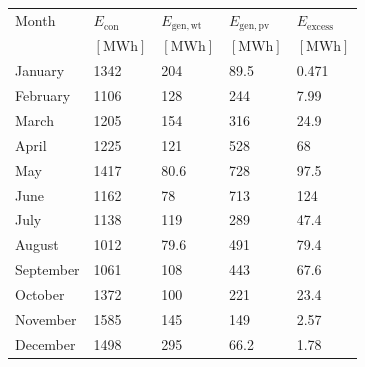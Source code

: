 \begin{table}
\label{tab: MonthlyEnergy}
\begin{tabular}{lllll}
\toprule
Month & $E_{\mathrm{con}}$ & $E_{\mathrm{gen,wt}}$ & $E_{\mathrm{gen,pv}}$ & $E_{\mathrm{excess}}$ \\
 & $\left[\mathrm{MWh}\right]$ & $\left[\mathrm{MWh}\right]$ & $\left[\mathrm{MWh}\right]$ & $\left[\mathrm{MWh}\right]$ \\
\midrule
January & 1342 & 204 & 89.5 & 0.471 \\
February & 1106 & 128 & 244 & 7.99 \\
March & 1205 & 154 & 316 & 24.9 \\
April & 1225 & 121 & 528 & 68 \\
May & 1417 & 80.6 & 728 & 97.5 \\
June & 1162 & 78 & 713 & 124 \\
July & 1138 & 119 & 289 & 47.4 \\
August & 1012 & 79.6 & 491 & 79.4 \\
September & 1061 & 108 & 443 & 67.6 \\
October & 1372 & 100 & 221 & 23.4 \\
November & 1585 & 145 & 149 & 2.57 \\
December & 1498 & 295 & 66.2 & 1.78 \\
\bottomrule
\end{tabular}
\end{table}
